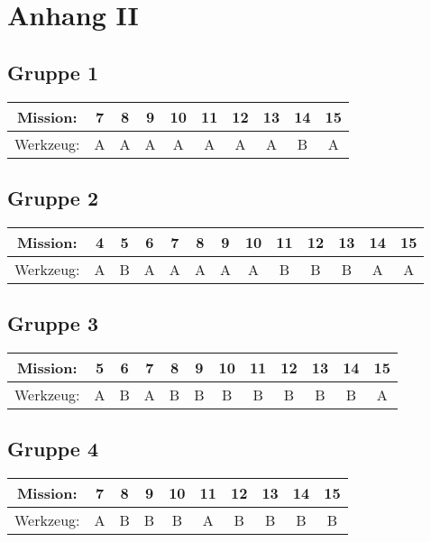 \documentclass[]{article}
\begin{document}
\newpage
\section*{Anhang II}
\subsection*{Gruppe 1}
\begin{tabular}{|c|c|c|c|c|c|c|c|c|c|}
\hline
Mission: & 7 & 8 & 9 & 10 & 11 & 12 & 13 & 14 & 15\\
\hline
Werkzeug: & A & A & A & A & A & A & A & B & A\\
\hline
\end{tabular}


\subsection*{Gruppe 2}
\begin{tabular}{|c|c|c|c|c|c|c|c|c|c|c|c|c|}
\hline
Mission: & 4 & 5 & 6 & 7 & 8 & 9 & 10 & 11 & 12 & 13 & 14 & 15\\
\hline
Werkzeug: & A & B & A & A & A & A & A & B & B & B & A & A\\
\hline
\end{tabular}


\subsection*{Gruppe 3}
\begin{tabular}{|c|c|c|c|c|c|c|c|c|c|c|c|}
\hline
Mission: & 5 & 6 & 7 & 8 & 9 & 10 & 11 & 12 & 13 & 14 & 15\\
\hline
Werkzeug: & A & B & A & B & B & B & B & B & B & B & A\\
\hline
\end{tabular}


\subsection*{Gruppe 4}
\begin{tabular}{|c|c|c|c|c|c|c|c|c|c|}
\hline
Mission: & 7 & 8 & 9 & 10 & 11 & 12 & 13 & 14 & 15\\
\hline
Werkzeug: & A & B & B & B & A & B & B & B & B\\
\hline
\end{tabular}
\end{document}
